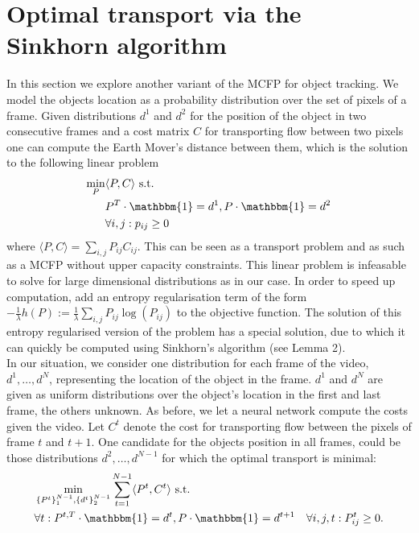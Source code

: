 \documentclass{article}
\begin{document}
\section{Optimal transport via the Sinkhorn algorithm}
In this section we explore another variant of the MCFP for object tracking. We model the objects location as a probability distribution over the set of pixels of a frame. Given distributions $d^1$ and $d^2$ for the position of the object in two consecutive frames and a cost matrix $C$ for transporting flow between two pixels one can compute the Earth Mover's distance between them, which is the solution to the following linear problem
\begin{align}\label{EMD}
\min_{P} &\langle P, C \rangle \textnormal{ s.t. } \\
& P^T \cdot \mathbbm{1} = d^1,  P\cdot \mathbbm{1} = d^2 \\
&\forall i, j: p_{ij} \geq 0
\end{align}
where $\langle P, C \rangle = \sum_{i,j} P_{ij}C_{ij}$. This can be seen as a transport problem and as such as a MCFP without upper capacity constraints. This linear problem is infeasable to solve for large dimensional distributions as in our case. In order to speed up computation, \cite{Cut13} add an entropy regularisation term of the form $-\frac{1}{\lambda}h(P) := \frac{1}{\lambda}\sum_{i,j} P_{ij}\log(P_{ij})$ to the objective function. The solution of this entropy regularised version of the problem has a special solution, due to which it can quickly be computed using Sinkhorn's algorithm (see \cite{Cut13} Lemma 2). \\
In our situation, we consider one distribution for each frame of the video, $d^1, \dots, d^N$, representing the location of the object in the frame. $d^1$ and $d^N$ are given as uniform distributions over the object's location in the first and last frame, the others unknown. As before, we let a neural network compute the costs given the video. Let $C^t$ denote the cost for transporting flow between the pixels of frame $t$ and $t+1$. One candidate for the objects position in all frames, could be those distributions $d^2, \dots, d^{N-1}$ for which the optimal transport is minimal:
\begin{align}\label{EMDtrack}
&\min_{\{P^t\}_1^{N-1}, \{d^t\}_2^{N-1}} \sum_{t=1}^{N-1} \langle P^t, C^t\rangle \textnormal{ s.t. }\\
&\forall t: P^{t,T} \cdot \mathbbm{1} = d^t, P\cdot \mathbbm{1} = d^{t+1}
&\forall i,j,t: P^t_{ij} \geq 0.
\end{align}
\end{document}
